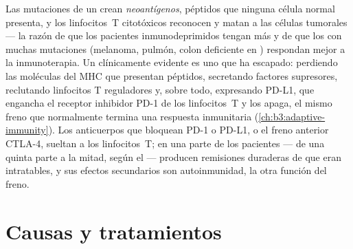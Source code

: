 \begin{proposition}\label{prop:b3:cancer-biology:immune}
Las mutaciones de un  crean \emph{neoantígenos}, péptidos que
ninguna célula normal presenta, y los linfocitos~T citotóxicos reconocen
y matan a las células tumorales --- la razón de que los pacientes
inmunodeprimidos tengan más  y de que los  con muchas
mutaciones (melanoma, pulmón, colon deficiente en ) respondan mejor a la inmunoterapia. Un  clínicamente
evidente es uno que ha escapado: perdiendo las moléculas del MHC que
presentan péptidos, secretando factores supresores, reclutando linfocitos
T reguladores y, sobre todo, expresando PD-L1, que engancha el receptor
inhibidor PD-1 de los linfocitos~T y los apaga, el mismo freno que
normalmente termina una respuesta inmunitaria
(\cref{ch:b3:adaptive-immunity}). Los anticuerpos que bloquean PD-1 o
PD-L1, o el freno anterior CTLA-4, sueltan a los linfocitos~T; en una
parte de los pacientes --- de una quinta parte a la mitad, según el 
--- producen remisiones duraderas de  que eran intratables, y sus
efectos secundarios son autoinmunidad, la otra función del freno.
\end{proposition}

\section{Causas y tratamientos}

